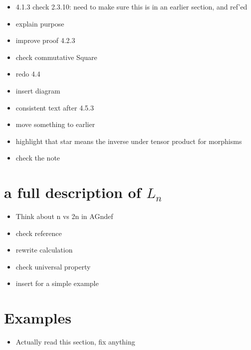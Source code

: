 \documentclass{amsart}
\begin{document}
\begin{itemize}




\item 4.1.3 check 2.3.10: need to make sure this is in an earlier section, and ref'ed


\item explain purpose
\item improve proof 4.2.3

\item check commutative Square

\item redo 4.4
\item insert diagram

\item consistent text after 4.5.3
\item move something to earlier


\item highlight that star means the inverse under tensor product for morphisms




\item check the note


\end{itemize}



\section{a full description of $L_n $}

\begin{itemize}


\item Think about n vs 2n in {AGndef}
\item check reference
\item rewrite calculation
\item check universal property
\item insert for a simple example
\end{itemize}



\section{ Examples}

\begin{itemize}
\item Actually read this section, fix anything
\end{itemize}
\newpage
\end{document}

